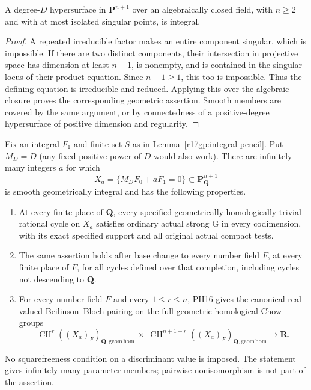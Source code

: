 \begin{lemma}
\label{r17gp:integral-fiber}
A degree-$D$ hypersurface in $\mathbf P^{n+1}$ over an algebraically
closed field, with $n\ge2$ and with at most isolated singular
points, is integral.
\end{lemma}

\begin{proof}
A repeated irreducible factor makes an entire component singular,
which is impossible. If there are two distinct components, their
intersection in projective space has dimension at least $n-1$,
is nonempty, and is contained in the singular locus of their
product equation. Since $n-1\ge1$, this too is impossible.
Thus the defining equation is irreducible and reduced. Applying
this over the algebraic closure proves the corresponding
geometric assertion. Smooth members are covered by the same
argument, or by connectedness of a positive-degree hypersurface
of positive dimension and regularity.
\end{proof}

\begin{theorem}
\label{r17gp:global-family}
Fix an integral $F_1$ and finite set $S$ as in
Lemma~\ref{r17gp:integral-pencil}. Put $M_D=D$ (any fixed
positive power of $D$ would also work). There are infinitely
many integers $a$ for which
\[
 X_a=\{M_DF_0+aF_1=0\}\subset\mathbf P^{n+1}_{\mathbf Q}
 \tag{GP17.3}\label{r17gp:member}
\]
is smooth geometrically integral and has the following
properties.
\begin{enumerate}
\item At every finite place of $\mathbf Q$, every specified
      geometrically homologically trivial rational cycle on
      $X_a$ satisfies ordinary actual strong G in every
      codimension, with its exact specified support and all
      original actual compact tests.
\item The same assertion holds after base change to every
      number field $F$, at every finite place of $F$, for
      all cycles defined over that completion, including
      cycles not descending to $\mathbf Q$.
\item For every number field $F$ and every $1\le r\le n$,
      PH16 gives the canonical real-valued Beilinson--Bloch pairing
      on the full geometric homological Chow groups
      \[
       \operatorname{CH}^r((X_a)_F)_{\mathbf Q,\mathrm{geom\,hom}}
       \ \times\ 
       \operatorname{CH}^{n+1-r}((X_a)_F)_{\mathbf Q,\mathrm{geom\,hom}}
                           \longrightarrow\mathbf R.
       \tag{GP17.4}\label{r17gp:height}
      \]
\end{enumerate}
No squarefreeness condition on a discriminant value is imposed.
The statement gives infinitely many parameter members; pairwise
nonisomorphism is not part of the assertion.
\end{theorem}

